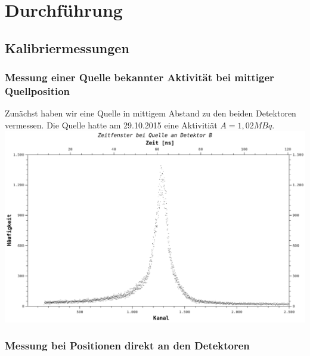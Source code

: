 \section{Durchführung}

\subsection{Kalibriermessungen}
    \subsubsection{Messung einer Quelle bekannter Aktivität bei mittiger Quellposition}
       Zunächst haben wir eine Quelle in mittigem Abstand zu den beiden Detektoren vermessen. Die Quelle hatte am 29.10.2015 eine Aktivitiät $A = 1,02 MBq$.\\
       \vspace{2mm}
       \minipanf 
                  \label{dfd:T_A}
       \minipend
       \minipanf 
       \vspace{3mm}
       \includegraphics{../2015_10_29/qtiplots/notfallbilder/T_B_dia.png}
       \label{dfd:T_B}
       \minipend       

    \subsubsection{Messung bei Positionen direkt an den Detektoren}

        
